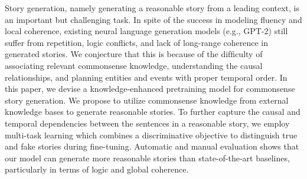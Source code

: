 Story generation, namely generating a reasonable story from a leading context, is an important but challenging task. In spite of the success in modeling ﬂuency and local coherence, existing neural language generation models (e.g., GPT-2) still suffer from repetition, logic conﬂicts, and lack of long-range coherence in generated stories. We conjecture that this is because of the difﬁculty of associating relevant commonsense knowledge, understanding the causal relationships, and planning entities and events with proper temporal order. In this paper, we devise a knowledge-enhanced pretraining model for commonsense story generation. We propose to utilize commonsense knowledge from external knowledge bases to generate reasonable stories. To further capture the causal and temporal dependencies between the sentences in a reasonable story, we employ multi-task learning which combines a discriminative objective to distinguish true and fake stories during ﬁne-tuning. Automatic and manual evaluation shows that our model can generate more reasonable stories than state-of-the-art baselines, particularly in terms of logic and global coherence.